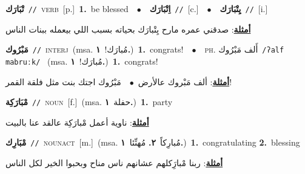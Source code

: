 \documentclass[10pt,a4paper,twoside]{article} %
\begin{document}
\begin{multicols}{2}
{\setlength\topsep{0pt}\textbf{\foreignlanguage{arabic}{تْبَارَك}}\ {\color{gray}\texttt{//}\color{black}}\ \textsc{verb}\ [p.]\ \textbf{1.}~be blessed\ \ $\bullet$\ \ \setlength\topsep{0pt}\textbf{\foreignlanguage{arabic}{اِتْبَارَك}}\ {\color{gray}\texttt{//}\color{black}}\ [c.]\ \ $\bullet$\ \ \setlength\topsep{0pt}\textbf{\foreignlanguage{arabic}{يِتْبَارَك}}\ {\color{gray}\texttt{//}\color{black}}\ [i.]\  \begin{flushright}\color{gray}\foreignlanguage{arabic}{\textbf{\underline{\foreignlanguage{arabic}{أمثلة}}}: صدقني عمره مارح يِتْبارَك بحياته بسبب اللي بيعمله ببنات الناس}\end{flushright}\color{black}} \vspace{2mm}

{\setlength\topsep{0pt}\textbf{\foreignlanguage{arabic}{مَبْرُوك}}\ {\color{gray}\texttt{//}\color{black}}\ \textsc{interj}\ \color{gray}(msa. \foreignlanguage{arabic}{مُبارَك!}~\foreignlanguage{arabic}{\textbf{١.}})\color{black}\ \textbf{1.}~congrats!\ \ $\bullet$\ \ \textsc{ph.} \color{gray} \foreignlanguage{arabic}{أَلف مَبْرُوك}\color{black}\ {\color{gray}\texttt{/{\sffamily ʔalf mabruːk}/}\color{black}}\ \color{gray} (msa. \foreignlanguage{arabic}{مُبارَك!}~\foreignlanguage{arabic}{\textbf{١.}})\color{black}\ \textbf{1.}~congrats!\  \begin{flushright}\color{gray}\foreignlanguage{arabic}{\textbf{\underline{\foreignlanguage{arabic}{أمثلة}}}: ألف مَبْروك عالأرض\ $\bullet$\ \  مَبْرُوك اجتك بنت مثل فلقة القمر!}\end{flushright}\color{black}} \vspace{2mm}

{\setlength\topsep{0pt}\textbf{\foreignlanguage{arabic}{مْبَارَكِة}}\ {\color{gray}\texttt{//}\color{black}}\ \textsc{noun}\ [f.]\ \color{gray}(msa. \foreignlanguage{arabic}{حفلة}~\foreignlanguage{arabic}{\textbf{١.}})\color{black}\ \textbf{1.}~party\  \begin{flushright}\color{gray}\foreignlanguage{arabic}{\textbf{\underline{\foreignlanguage{arabic}{أمثلة}}}: ناوية أعمل مْبارَكِة عالقد عنا بالبيت}\end{flushright}\color{black}} \vspace{2mm}

{\setlength\topsep{0pt}\textbf{\foreignlanguage{arabic}{مْبَارِك}}\ {\color{gray}\texttt{//}\color{black}}\ \textsc{noun\textunderscore act}\ [m.]\ \color{gray}(msa. \foreignlanguage{arabic}{مُبارِكاً}~\foreignlanguage{arabic}{\textbf{٢.}}  \foreignlanguage{arabic}{مُهنِّئا}~\foreignlanguage{arabic}{\textbf{١.}})\color{black}\ \textbf{1.}~congratulating  \textbf{2.}~blessing\  \begin{flushright}\color{gray}\foreignlanguage{arabic}{\textbf{\underline{\foreignlanguage{arabic}{أمثلة}}}: ربنا مْبارَِكلهم عشانهم ناس مناح وبحبوا الخير لكل الناس}\end{flushright}\color{black}} \vspace{2mm}


\end{multicols}
\end{document}
